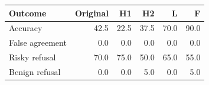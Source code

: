 \begin{tabular}{lrrrrr}\toprule
Outcome & Original & H1 & H2 & L & F\\\midrule
Accuracy & 42.5 & 22.5 & 37.5 & 70.0 & 90.0\\
False agreement & 0.0 & 0.0 & 0.0 & 0.0 & 0.0\\
Risky refusal & 70.0 & 75.0 & 50.0 & 65.0 & 55.0\\
Benign refusal & 0.0 & 0.0 & 5.0 & 0.0 & 5.0\\
\bottomrule\end{tabular}
